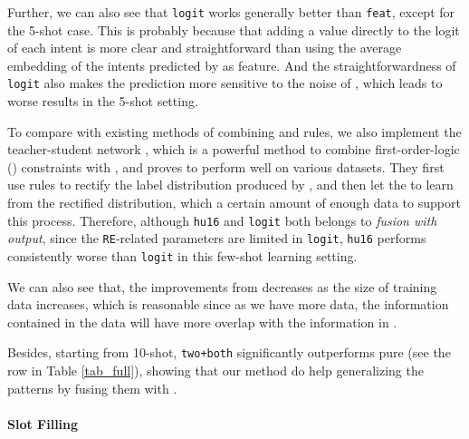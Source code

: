 Further, we can also see that \texttt{logit} works generally better than \texttt{feat}, except for the 5-shot case. This is probably because that adding a value directly to the logit of each intent is more clear and straightforward than using the average embedding of the intents predicted by \RE as feature. And the straightforwardness of \texttt{logit} also makes the prediction more sensitive to the noise of \RE, which leads to worse results in the 5-shot setting.

To compare with existing methods of combining \NN and rules, we also implement the teacher-student network \cite{liu2016attention}, which is a powerful method to combine first-order-logic (\FOL) constraints with \NN, and proves to perform well on various datasets. 
They first use \FOL rules to rectify the label distribution produced by \NN, and then let the \NN to learn from the rectified distribution, which a certain amount of enough data to support this process. 
Therefore, although \texttt{hu16} and \texttt{logit} both belongs to \emph{fusion with output},
since the \texttt{RE}-related parameters are limited in \texttt{logit},
\texttt{hu16} performs consistently worse than \texttt{logit} in this few-shot learning setting.

We can also see that, the improvements from \RE decreases as the size of training data increases, 
which is reasonable since as we have more data, the information contained in the data will have more overlap with the information in \RE. 

Besides, starting from 10-shot, \texttt{two+both} significantly outperforms pure \RE (see the \RE row in Table \ref{tab_full}), showing that our method do help generalizing the \RE patterns by fusing them with \NN. 


\paragraph{Slot Filling}

